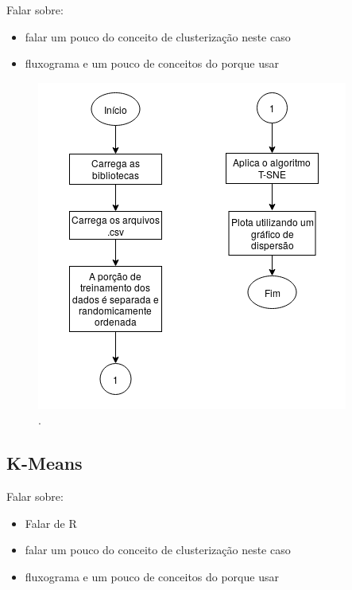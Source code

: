 Falar sobre: 
\begin{itemize}
    \item falar um pouco do conceito de clusterização neste caso
    \item fluxograma e um pouco de conceitos do porque usar
\end{itemize}

\begin{figure}[H]
    \caption{.}
    \begin{center}
        \includegraphics[scale=.65]{metodologia/img/t-sne.png}
    \end{center}
    \label{fig:}
\end{figure}

%  

\subsection{K-Means}

Falar sobre: 
\begin{itemize}
    \item Falar de R
    \item falar um pouco do conceito de clusterização neste caso
    \item fluxograma e um pouco de conceitos do porque usar
\end{itemize}

